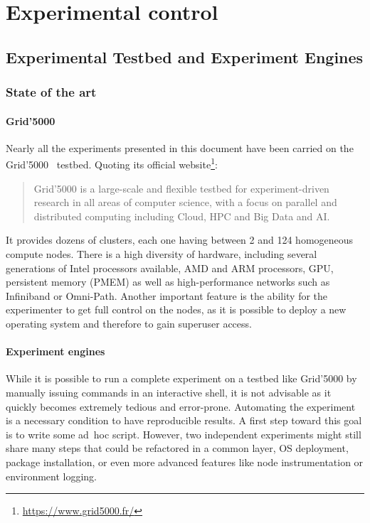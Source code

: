\part{Experimental control}
\label{part:experiment}

\chapter{Experimental Testbed and Experiment Engines}%
\label{chapter:experiment:testbed}

    \section{State of the art}%
    \label{sec:state_of_the_art}

        \subsection{Grid'5000}%
        \label{sub:grid_5000}

            Nearly all the experiments presented in this document have been carried on the Grid'5000~\cite{grid5000}
            testbed.  Quoting its official website\footnote{\url{https://www.grid5000.fr/}}: \blockquote{Grid'5000 is a
            large-scale and flexible testbed for experiment-driven research in all areas of computer science, with a
            focus on parallel and distributed computing including Cloud, HPC and Big Data and AI.} It provides dozens of
            clusters, each one having between 2 and 124 homogeneous compute nodes. There is a high diversity of hardware,
            including several generations of Intel processors available, AMD and ARM processors, GPU, persistent memory
            (PMEM) as well as high-performance networks such as Infiniband or Omni-Path. Another important feature is the
            ability for the experimenter to get full control on the nodes, as it is possible to deploy a new operating
            system and therefore to gain superuser access.

        \subsection{Experiment engines}%
        \label{sub:experiment_engines}

            While it is possible to run a complete experiment on a testbed like Grid'5000 by manually issuing commands
            in an interactive shell, it is not advisable as it quickly becomes extremely tedious and error-prone.
            Automating the experiment is a necessary condition to have reproducible results. A first step toward this
            goal is to write some ad~hoc script. However, two independent experiments might still share many steps that
            could be refactored in a common layer, \eg OS deployment, package installation, or even more advanced
            features like node instrumentation or environment logging.

